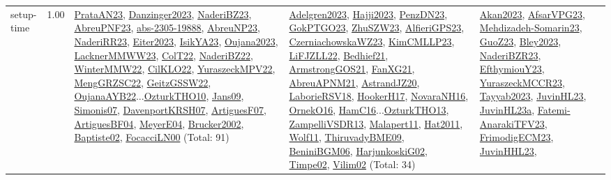 {\begin{longtable}{p{3cm}r>{\raggedright\arraybackslash}p{6cm}>{\raggedright\arraybackslash}p{6cm}>{\raggedright\arraybackslash}p{8cm}}
\index{setup-time}\index{Concepts!setup-time}setup-time &  1.00 & \hyperref[detail:PrataAN23]{PrataAN23}, \hyperref[detail:Danzinger2023]{Danzinger2023}, \hyperref[detail:NaderiBZ23]{NaderiBZ23}, \hyperref[detail:AbreuPNF23]{AbreuPNF23}, \hyperref[detail:abs-2305-19888]{abs-2305-19888}, \hyperref[detail:AbreuNP23]{AbreuNP23}, \hyperref[detail:NaderiRR23]{NaderiRR23}, \hyperref[detail:Eiter2023]{Eiter2023}, \hyperref[detail:IsikYA23]{IsikYA23}, \hyperref[detail:Oujana2023]{Oujana2023}, \hyperref[detail:LacknerMMWW23]{LacknerMMWW23}, \hyperref[detail:ColT22]{ColT22}, \hyperref[detail:NaderiBZ22]{NaderiBZ22}, \hyperref[detail:WinterMMW22]{WinterMMW22}, \hyperref[detail:CilKLO22]{CilKLO22}, \hyperref[detail:YuraszeckMPV22]{YuraszeckMPV22}, \hyperref[detail:MengGRZSC22]{MengGRZSC22}, \hyperref[detail:GeitzGSSW22]{GeitzGSSW22}, \hyperref[detail:OujanaAYB22]{OujanaAYB22}...\hyperref[detail:OzturkTHO10]{OzturkTHO10}, \hyperref[detail:Jans09]{Jans09}, \hyperref[detail:Simonis07]{Simonis07}, \hyperref[detail:DavenportKRSH07]{DavenportKRSH07}, \hyperref[detail:ArtiguesF07]{ArtiguesF07}, \hyperref[detail:ArtiguesBF04]{ArtiguesBF04}, \hyperref[detail:MeyerE04]{MeyerE04}, \hyperref[detail:Brucker2002]{Brucker2002}, \hyperref[detail:Baptiste02]{Baptiste02}, \hyperref[detail:FocacciLN00]{FocacciLN00} (Total: 91) & \hyperref[detail:Adelgren2023]{Adelgren2023}, \hyperref[detail:Hajji2023]{Hajji2023}, \hyperref[detail:PenzDN23]{PenzDN23}, \hyperref[detail:GokPTGO23]{GokPTGO23}, \hyperref[detail:ZhuSZW23]{ZhuSZW23}, \hyperref[detail:AlfieriGPS23]{AlfieriGPS23}, \hyperref[detail:CzerniachowskaWZ23]{CzerniachowskaWZ23}, \hyperref[detail:KimCMLLP23]{KimCMLLP23}, \hyperref[detail:LiFJZLL22]{LiFJZLL22}, \hyperref[detail:Bedhief21]{Bedhief21}, \hyperref[detail:ArmstrongGOS21]{ArmstrongGOS21}, \hyperref[detail:FanXG21]{FanXG21}, \hyperref[detail:AbreuAPNM21]{AbreuAPNM21}, \hyperref[detail:AstrandJZ20]{AstrandJZ20}, \hyperref[detail:LaborieRSV18]{LaborieRSV18}, \hyperref[detail:HookerH17]{HookerH17}, \hyperref[detail:NovaraNH16]{NovaraNH16}, \hyperref[detail:OrnekO16]{OrnekO16}, \hyperref[detail:HamC16]{HamC16}...\hyperref[detail:OzturkTHO13]{OzturkTHO13}, \hyperref[detail:ZampelliVSDR13]{ZampelliVSDR13}, \hyperref[detail:Malapert11]{Malapert11}, \hyperref[detail:Hat2011]{Hat2011}, \hyperref[detail:Wolf11]{Wolf11}, \hyperref[detail:ThiruvadyBME09]{ThiruvadyBME09}, \hyperref[detail:BeniniBGM06]{BeniniBGM06}, \hyperref[detail:HarjunkoskiG02]{HarjunkoskiG02}, \hyperref[detail:Timpe02]{Timpe02}, \hyperref[detail:Vilim02]{Vilim02} (Total: 34) & \hyperref[detail:Akan2023]{Akan2023}, \hyperref[detail:AfsarVPG23]{AfsarVPG23}, \hyperref[detail:Mehdizadeh-Somarin23]{Mehdizadeh-Somarin23}, \hyperref[detail:GuoZ23]{GuoZ23}, \hyperref[detail:Bley2023]{Bley2023}, \hyperref[detail:NaderiBZR23]{NaderiBZR23}, \hyperref[detail:EfthymiouY23]{EfthymiouY23}, \hyperref[detail:YuraszeckMCCR23]{YuraszeckMCCR23}, \hyperref[detail:Tayyab2023]{Tayyab2023}, \hyperref[detail:JuvinHL23]{JuvinHL23}, \hyperref[detail:JuvinHL23a]{JuvinHL23a}, \hyperref[detail:Fatemi-AnarakiTFV23]{Fatemi-AnarakiTFV23}, \hyperref[detail:FrimodigECM23]{FrimodigECM23}, \hyperref[detail:JuvinHHL23]{JuvinHHL23}, 
\end{longtable}}
